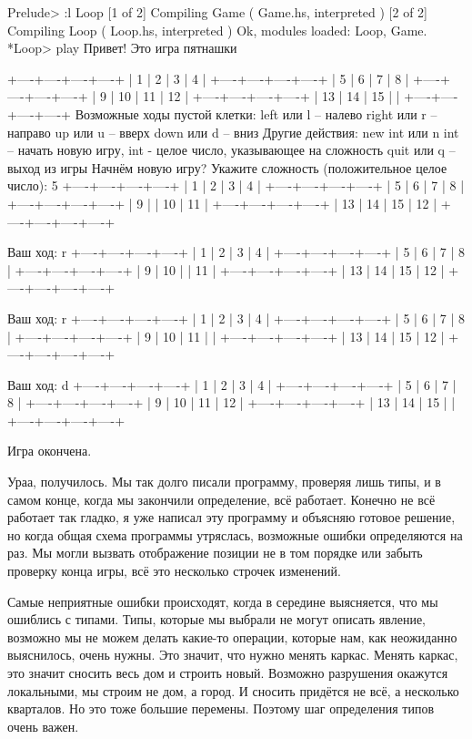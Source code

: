 \begin{code}
Prelude> :l Loop
[1 of 2] Compiling Game             ( Game.hs, interpreted )
[2 of 2] Compiling Loop             ( Loop.hs, interpreted )
Ok, modules loaded: Loop, Game.
*Loop> play
Привет! Это игра пятнашки

	+----+----+----+----+
	|  1 |  2 |  3 |  4 |
	+----+----+----+----+
	|  5 |  6 |  7 |  8 |
	+----+----+----+----+
	|  9 | 10 | 11 | 12 |
	+----+----+----+----+
	| 13 | 14 | 15 |    |
	+----+----+----+----+
Возможные ходы пустой клетки:
   left     или l       -- налево
   right    или r       -- направо
   up       или u       -- вверх
   down     или d       -- вниз
Другие действия:
   new int  или n int -- начать новую игру, int - целое число,
указывающее на сложность
   quit     или q      -- выход из игры
Начнём новую игру?
Укажите сложность (положительное целое число): 
5
	+----+----+----+----+
	|  1 |  2 |  3 |  4 |
	+----+----+----+----+
	|  5 |  6 |  7 |  8 |
	+----+----+----+----+
	|  9 |    | 10 | 11 |
	+----+----+----+----+
	| 13 | 14 | 15 | 12 |
	+----+----+----+----+

Ваш ход: 
r
	+----+----+----+----+
	|  1 |  2 |  3 |  4 |
	+----+----+----+----+
	|  5 |  6 |  7 |  8 |
	+----+----+----+----+
	|  9 | 10 |    | 11 |
	+----+----+----+----+
	| 13 | 14 | 15 | 12 |
	+----+----+----+----+

Ваш ход: 
r
	+----+----+----+----+
	|  1 |  2 |  3 |  4 |
	+----+----+----+----+
	|  5 |  6 |  7 |  8 |
	+----+----+----+----+
	|  9 | 10 | 11 |    |
	+----+----+----+----+
	| 13 | 14 | 15 | 12 |
	+----+----+----+----+

Ваш ход: 
d
	+----+----+----+----+
	|  1 |  2 |  3 |  4 |
	+----+----+----+----+
	|  5 |  6 |  7 |  8 |
	+----+----+----+----+
	|  9 | 10 | 11 | 12 |
	+----+----+----+----+
	| 13 | 14 | 15 |    |
	+----+----+----+----+

Игра окончена.
\end{code}

Ураа, получилось. Мы так долго писали программу, проверяя лишь типы,
и в самом конце, когда мы закончили определение, всё работает.
Конечно не всё работает так гладко, я уже написал эту программу
и объясняю готовое решение, но когда общая схема программы 
утряслась, возможные ошибки определяются на раз. Мы могли вызвать
отображение позиции не в том порядке или забыть проверку 
конца игры, всё это несколько строчек изменений. 

Самые неприятные ошибки происходят, когда в середине выясняется,
что мы ошиблись с типами. Типы, которые мы выбрали не могут
описать явление, возможно мы не можем делать какие-то
операции, которые нам, как неожиданно выяснилось, очень нужны.
Это значит, что нужно менять каркас.
Менять каркас, это значит сносить весь дом и строить новый.
Возможно разрушения окажутся локальными, мы строим не дом,
а город. И сносить придётся не всё, а несколько кварталов.
Но это тоже большие перемены.
Поэтому шаг определения типов очень важен. 

